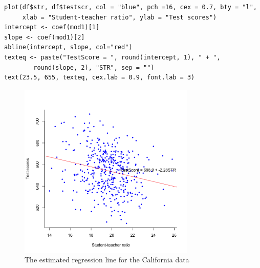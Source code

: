 \documentclass[11pt]{article}
\begin{document}
\begin{verbatim}
plot(df$str, df$testscr, col = "blue", pch =16, cex = 0.7, bty = "l",
     xlab = "Student-teacher ratio", ylab = "Test scores")
intercept <- coef(mod1)[1]
slope <- coef(mod1)[2]
abline(intercept, slope, col="red")
texteq <- paste("TestScore = ", round(intercept, 1), " + ",
		round(slope, 2), "STR", sep = "")
text(23.5, 655, texteq, cex.lab = 0.9, font.lab = 3)
\end{verbatim}

\begin{figure}[htbp]
\centering
\includegraphics[width=0.75\textwidth]{fig43.png}
\caption{The estimated regression line for the California data}
\end{figure}
\end{document}
